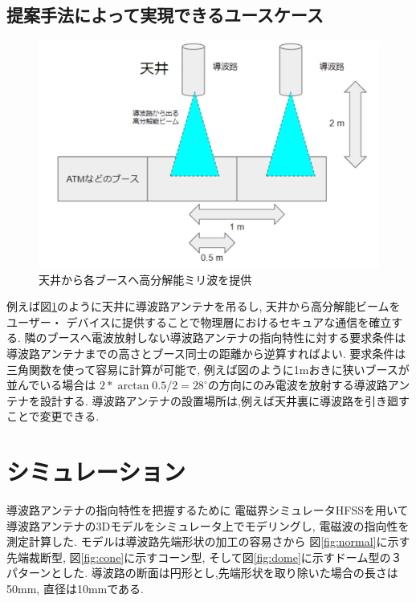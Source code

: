 \documentclass[technicalreport]{ieicej}
\begin{document}
\subsection{提案手法によって実現できるユースケース}

\begin{figure}[tb]
  \vspace{20mm}
  \begin{center}
    \includegraphics[bb=0 0 384 262, width=0.7\linewidth]{img/usecase.pdf}
    \caption{天井から各ブースへ高分解能ミリ波を提供}
    \label{fig:usecase}
  \end{center}
\end{figure}


例えば図\ref{fig:usecase}のように天井に導波路アンテナを吊るし,
天井から高分解能ビームをユーザー・
デバイスに提供することで物理層におけるセキュアな通信を確立する.
隣のブースへ電波放射しない導波路アンテナの指向特性に対する要求条件は
導波路アンテナまでの高さとブース同士の距離から逆算すればよい.
要求条件は三角関数を使って容易に計算が可能で,
例えば図のように1mおきに狭いブースが並んでいる場合は
$2 * \arctan 0.5 / 2 = 28^{\circ}$の方向にのみ電波を放射する導波路アンテナを設計する.
導波路アンテナの設置場所は,例えば天井裏に導波路を引き廻すことで変更できる.

\section{シミュレーション}

導波路アンテナの指向特性を把握するために 
電磁界シミュレータHFSSを用いて導波路アンテナの3Dモデルをシミュレータ上でモデリングし,
電磁波の指向性を測定計算した.
モデルは導波路先端形状の加工の容易さから
図\ref{fig:normal}に示す先端裁断型,
図\ref{fig:cone}に示すコーン型,
そして図\ref{fig:dome}に示すドーム型の３パターンとした.
導波路の断面は円形とし,先端形状を取り除いた場合の長さは50mm,
直径は10mmである.
\end{document}
